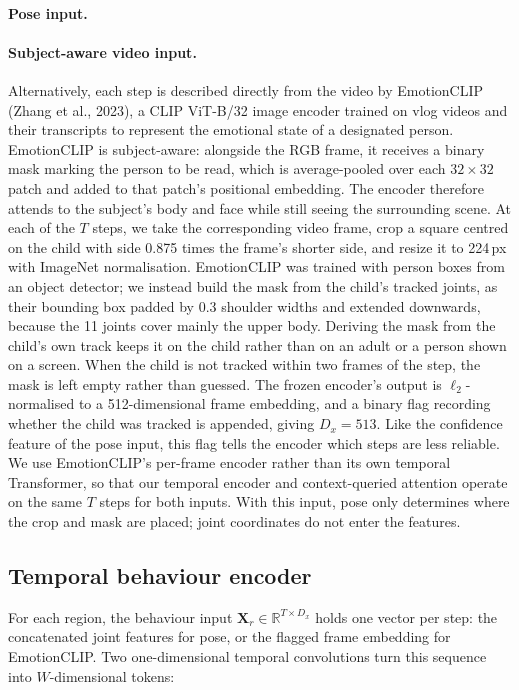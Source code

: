 \documentclass[11pt]{article}
\newcommand{\R}{\mathbb{R}}
\newcommand{\mX}{\mathbf{X}}
\begin{document}
\paragraph{Pose input.}


\paragraph{Subject-aware video input.} Alternatively, each step is described directly from the video by EmotionCLIP (Zhang et al., 2023), a CLIP ViT-B/32 image encoder trained on vlog videos and their transcripts to represent the emotional state of a designated person. EmotionCLIP is subject-aware: alongside the RGB frame, it receives a binary mask marking the person to be read, which is average-pooled over each $32\times32$ patch and added to that patch's positional embedding. The encoder therefore attends to the subject's body and face while still seeing the surrounding scene. At each of the $T$ steps, we take the corresponding video frame, crop a square centred on the child with side 0.875 times the frame's shorter side, and resize it to 224\,px with ImageNet normalisation. EmotionCLIP was trained with person boxes from an object detector; we instead build the mask from the child's tracked joints, as their bounding box padded by 0.3 shoulder widths and extended downwards, because the 11 joints cover mainly the upper body. Deriving the mask from the child's own track keeps it on the child rather than on an adult or a person shown on a screen. When the child is not tracked within two frames of the step, the mask is left empty rather than guessed. The frozen encoder's output is $\ell_2$-normalised to a 512-dimensional frame embedding, and a binary flag recording whether the child was tracked is appended, giving $D_x=513$. Like the confidence feature of the pose input, this flag tells the encoder which steps are less reliable. We use EmotionCLIP's per-frame encoder rather than its own temporal Transformer, so that our temporal encoder and context-queried attention operate on the same $T$ steps for both inputs. With this input, pose only determines where the crop and mask are placed; joint coordinates do not enter the features.

\subsection{Temporal behaviour encoder}
\label{sec:pose-encoder}

For each region, the behaviour input $\mX_r\in\R^{T\times D_x}$ holds one vector per step: the concatenated joint features for pose, or the flagged frame embedding for EmotionCLIP. Two one-dimensional temporal convolutions turn this sequence into $W$-dimensional tokens:
\end{document}
